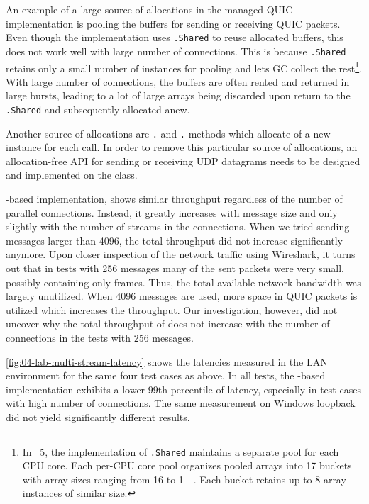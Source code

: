 An example of a large source of allocations in the managed QUIC implementation is pooling the
buffers for sending or receiving QUIC packets. Even though the implementation uses
\ArrayPoolOf{\Byte}\texttt{.Shared} to reuse allocated buffers, this does not work well with large
number of connections. This is because \ArrayPoolOf{\Byte}\texttt{.Shared} retains only a small
number of \ArrayOf{\Byte} instances for pooling and lets GC collect the rest\footnote{In
  \dotnet{}~5, the implementation of \ArrayPoolOf{\Byte}\texttt{.Shared} maintains a separate pool
  for each CPU core. Each per-CPU core pool organizes pooled arrays into 17 buckets with array sizes
  ranging from \SI{16}{\byte} to \SI{1}{\mebi\byte}. Each bucket retains up to 8 array instances of
  similar size.}. With large number of connections, the buffers are often rented and returned in
large bursts, leading to a lot of large arrays being discarded upon return to the
\ArrayPoolOf{\Byte}\texttt{.Shared} and subsequently allocated anew.

Another source of allocations are \Socket{}\texttt{.} and
\Socket{}\texttt{.} methods which allocate of a new  instance
for each call. In order to remove this particular source of allocations, an allocation-free API for
sending or receiving UDP datagrams needs to be designed and implemented on the \Socket{} class.

\libmsquic{}-based implementation, shows similar throughput regardless of the number of parallel
connections. Instead, it greatly increases with message size and only slightly with the number of
streams in the connections. When we tried sending messages larger than \SI{4096}{\byte}, the total
throughput did not increase significantly anymore. Upon closer inspection of the \libmsquic{}
network traffic using Wireshark, it turns out that in tests with \SI{256}{\byte} messages many of
the sent packets were very small, possibly containing only \ACK{} frames. Thus, the total available
network bandwidth was largely unutilized. When \SI{4096}{\byte} messages are used, more space in
QUIC packets is utilized which increases the throughput. Our investigation, however, did not uncover
why the total throughput of \libmsquic{} does not increase with the number of connections in the
tests with \SI{256}{\byte} messages.

\autoref{fig:04-lab-multi-stream-latency} shows the latencies measured in the LAN environment for
the same four test cases as above. In all tests, the \libmsquic{}-based implementation exhibits a
lower 99th percentile of latency, especially in test cases with high number of connections. The same
measurement on Windows loopback did not yield significantly different results.

